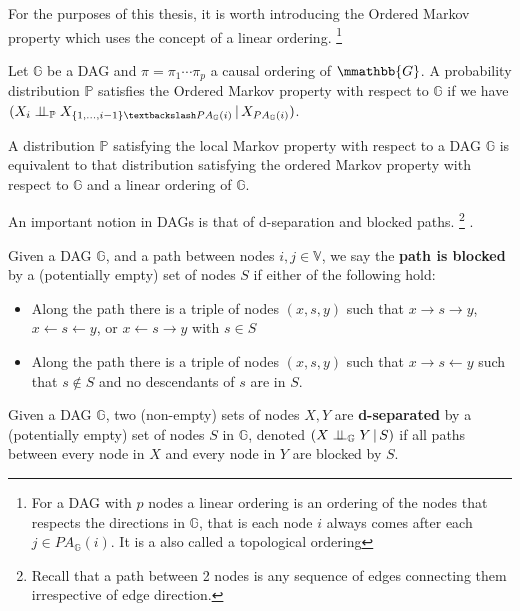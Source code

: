 \documentclass{tufte-book}
\begin{document}
For the purposes of this thesis, it is worth introducing the Ordered Markov property which uses the concept of a linear ordering.  \footnote{For a DAG  with $p$ nodes a linear ordering is an ordering of the nodes that respects the directions in $\mathbb{G}$, that is each node $i$ always comes after each $j \in PA_{\mathbb{G}}(i)$. It is a also called a topological ordering} 

\begin{definition}\label{orderedmarkov}
Let $\mathbb{G}$ be a DAG and $\pi = \pi_1 \cdots \pi_p$ a causal ordering of $\mmathbb{G}$. A probability distribution $\mathbb{P}$ satisfies the Ordered Markov property with respect to $\mathbb{G}$ if we have $(X_i \indep_{\mathbb{P}} X_{\{1,...,i-1 \} \textbackslash PA_{\mathbb{G}}(i)}\,|\, X_{PA_{\mathbb{G}}(i)})$.
\end{definition}

A distribution \(\mathbb{P}\) satisfying the local Markov property with respect to a DAG \(\mathbb{G}\) is equivalent to that distribution satisfying the ordered Markov property with respect to \(\mathbb{G}\) and a linear ordering of \(\mathbb{G}\).


An important notion in DAGs is that of d-separation and blocked paths.
  \footnote{\baselineskip \baselineskip Recall that a path between 2 nodes is any sequence of edges connecting them irrespective of edge direction.} .


\begin{definition}\label{bpath}

Given a DAG $\mathbb{G}$, and a path between nodes $i,j \in \mathbb{V}$, we say the \textbf{path is blocked} by a (potentially empty) set of nodes $S$ if either of the following hold:
\begin{itemize}
\item Along the path there is a triple of nodes $(x,s,y)$ such that $x \rightarrow s \rightarrow y$, $x \leftarrow s \leftarrow y$, or $x \leftarrow s \rightarrow y$ with $s \in S$
\item Along the path there is a triple of nodes $(x,s,y)$ such that $x \rightarrow s \leftarrow y$ such that $s \notin S$ and no descendants of $s$ are in $S$.
\end{itemize}

\end{definition}


\begin{definition}[d-separation]\label{def:dsep}

Given a DAG $\mathbb{G}$,  two (non-empty) sets of nodes $X,Y$ are \textbf{d-separated} by a (potentially empty) set of nodes $S$ in $\mathbb{G}$, denoted $(X\perp \!\!\! \perp_{\mathbb{G}}Y\,|\,S)$ if all paths between every node in $X$ and every node in $Y$ are blocked by $S$. 

\end{definition}
\end{document}
